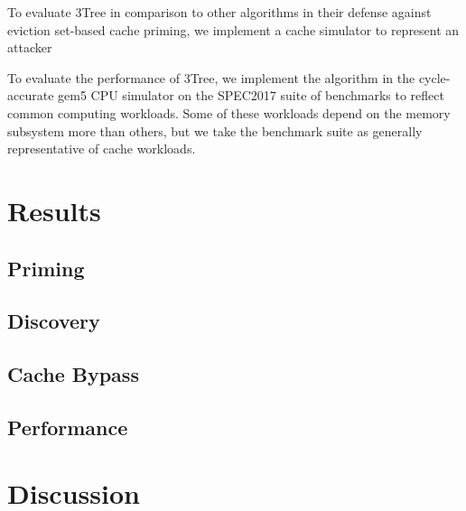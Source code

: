 \documentclass[sigconf, screen, review]{acmart}
\begin{document}
To evaluate 3Tree in comparison to other algorithms in their defense
against eviction set-based cache priming, %
we implement a cache simulator to represent an attacker

To evaluate the performance of 3Tree, we implement the algorithm in the
cycle-accurate gem5 CPU simulator on the SPEC2017 suite of benchmarks
to reflect common computing workloads.
Some of these workloads depend on the memory subsystem more than others,
but we take the benchmark suite as generally representative
of cache workloads.

\section{Results}

\subsection{Priming}

\subsection{Discovery}

\subsection{Cache Bypass}

\subsection{Performance}


\section{Discussion}


\begin{acks}
\end{acks}





\end{document}
